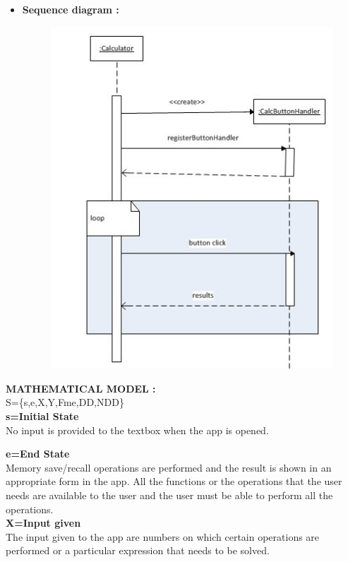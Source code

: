 \documentclass[a4paper,12pt]{article}
\begin{document}
\begin{itemize}
\item \textbf{Sequence diagram :}
\begin{figure}[h!]
		\centering
		\includegraphics[scale=0.5]{calcseq.jpg}
	\end{figure}

\end{itemize}

\bigskip\bigskip
\bigskip\bigskip
\noindent \textbf{MATHEMATICAL MODEL :}\\[0.5cm]
S=\{s,e,X,Y,Fme,DD,NDD\}\\


\textbf{s=Initial State}\\
No input is provided to the textbox when the app is opened.

\textbf{e=End State}\\

Memory save/recall operations are performed and the result is shown in an appropriate form in the app. All the functions or the operations that the user needs are available to the user and the user must be able to perform all the operations.
\\

\textbf{X=Input given}\\

The input given to the app are numbers on which certain operations are performed or a particular expression that needs to be solved.
\\
\end{document}
